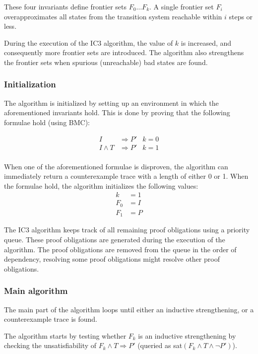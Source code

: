 \documentclass[a4paper]{article}
\begin{document}
These four invariants define frontier sets $F_0 \ldots F_k$. A single frontier set $F_i$ overapproximates all states from the transition system reachable within $i$ steps or less.

During the execution of the IC3 algorithm, the value of $k$ is increased, and consequently more frontier sets are introduced. The algorithm also strengthens the frontier sets when spurious (unreachable) bad states are found.

\subsubsection{Initialization}
The algorithm is initialized by setting up an environment in which the aforementioned invariants hold. This is done by proving that the following formulae hold (using BMC):

\begin{align*}
I&\Rightarrow P' & k=0\\
I \land T &\Rightarrow P' & k=1\\
\end{align*}

\newpage
When one of the aforementioned formulae is disproven, the algorithm can immediately return a counterexample trace with a length of either 0 or 1. When the formulae hold, the algorithm initializes the following values:
\begin{align*}
k &= 1\\
F_0 &= I\\
F_1 &= P
\end{align*}

The IC3 algorithm keeps track of all remaining proof obligations using a priority queue. These proof obligations are generated during the execution of the algorithm. The proof obligations are removed from the queue in the order of dependency, resolving some proof obligations might resolve other proof obligations.

\subsubsection{Main algorithm}
The main part of the algorithm loops until either an inductive strengthening, or a counterexample trace is found.

The algorithm starts by testing whether $F_k$ is an inductive strengthening by checking the unsatisfiability of $F_k \land T \Rightarrow P'$ (queried as sat$(F_k \land T \land \lnot P')$).
\end{document}
